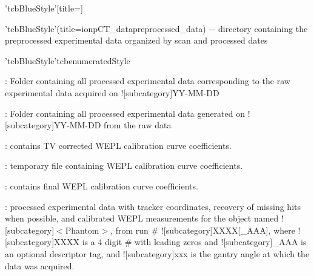 \clearpage%
\begin{tcbenvironment}'tcbBlueStyle'[title=]
\begin{tcbparagraph}'tcbBlueStyle'(title=\dirsep ion\dirsep pCT\_data\dirsep preprocessed\_data)%
$\boldsymbol{-}$ directory containing the preprocessed experimental data organized by scan and processed dates
\end{tcbparagraph}
\begin{tcbparagraph}'tcbBlueStyle'{tcbenumeratedStyle}
	\begin{ThinEnum}[labelindent=1pt, leftmargin=*]
	    \item {} : Folder containing all processed experimental data corresponding to the raw experimental data acquired on \docentry![subcategory]{YY-MM-DD}
	    \begin{ThinEnum}[labelindent=1pt, leftmargin=*]
	        \item {} : Folder containing all processed experimental data generated on \docentry![subcategory]{YY-MM-DD} from the raw data
	        \begin{ThinEnum}[labelindent=1pt, leftmargin=*]
	            \item {} : contains TV corrected WEPL calibration curve coefficients.
			\item {} : temporary file containing WEPL calibration curve coefficients.
			\item {} : contains final WEPL calibration curve coefficients.
			\item {} : processed experimental data with tracker coordinates, recovery of missing hits when possible, and calibrated WEPL measurements for the object named \docentry![subcategory]{$<$Phantom$>$}, from run \# \docentry![subcategory]{XXXX[\_AAA]}, where \docentry![subcategory]{XXXX} is a 4 digit \# with leading zeros and \docentry![subcategory]{\_AAA} is an optional descriptor tag, and \docentry![subcategory]{xxx} is the gantry angle at which the data was acquired.
	        \end{ThinEnum}
	    \end{ThinEnum}
	\end{ThinEnum}
\end{tcbparagraph}
\end{tcbenvironment}
\endinput 